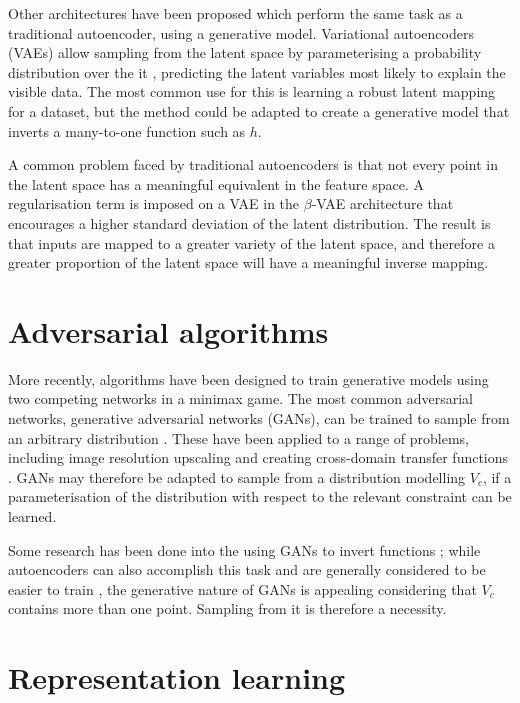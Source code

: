 \documentclass[../../main.tex]{subfiles}
\begin{document}
Other architectures have been proposed which perform the same task as a traditional autoencoder, using a generative model.
Variational autoencoders (VAEs) allow sampling from the latent space by parameterising a probability distribution over the it \cite{kingma14}, predicting the latent variables most likely to explain the visible data.
The most common use for this is learning a robust latent mapping for a dataset, but the method could be adapted to create a generative model that inverts a many-to-one function such as $h$.

A common problem faced by traditional autoencoders is that not every point in the latent space has a meaningful equivalent in the feature space.
A regularisation term is imposed on a VAE in the $\beta$-VAE architecture \cite{higgins16} that encourages a higher standard deviation of the latent distribution.
The result is that inputs are mapped to a greater variety of the latent space, and therefore a greater proportion of the latent space will have a meaningful inverse mapping.

\section{Adversarial algorithms} \label{section:adversarialAlgorithms}

More recently, algorithms have been designed to train generative models using two competing networks in a minimax game.
The most common adversarial networks, generative adversarial networks (GANs), can be trained to sample from an arbitrary distribution \cite{goodfellow14, horger18}.
These have been applied to a range of problems, including image resolution upscaling \cite{ledig17} and creating cross-domain transfer functions \cite{zhu18}.
GANs may therefore be adapted to sample from a distribution modelling $V_c$, if a parameterisation of the distribution with respect to the relevant constraint can be learned.

Some research has been done into the using GANs to invert functions \cite{anirudh18}; while autoencoders can also accomplish this task and are generally considered to be easier to train \cite{bang18}, the generative nature of GANs is appealing considering that $V_c$ contains more than one point.
Sampling from it is therefore a necessity.

\section{Representation learning} \label{section:representationLearning}
\end{document}
